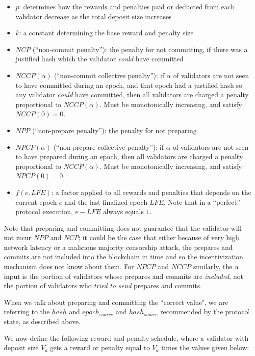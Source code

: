 \documentclass[12pt]{article}
\begin{document}
\begin{itemize}
\item $p$: determines how the rewards and penalties paid or deducted from each validator decrease as the total deposit size increases
\item $k$: a constant determining the base reward and penalty size
\item $NCP$ (``non-commit penalty''): the penalty for not committing, if there was a justified hash which the validator \textit{could} have committed
\item $NCCP(\alpha)$ (``non-commit collective penalty''): if $\alpha$ of validators are not seen to have committed during an epoch, and that epoch had a justified hash so any validator \textit{could} have committed, then all validators are charged a penalty proportional to $NCCP(\alpha)$. Must be monotonically increasing, and satisfy $NCCP(0) = 0$.
\item $NPP$ (``non-prepare penalty''): the penalty for not preparing
\item $NPCP(\alpha)$ (``non-prepare collective penalty''): if $\alpha$ of validators are not seen to have prepared during an epoch, then all validators are charged a penalty proportional to $NCCP(\alpha)$. Must be monotonically increasing, and satisfy $NPCP(0) = 0$.
\item $f(e, LFE)$: a factor applied to all rewards and penalties that depends on the current epoch $e$ and the last finalized epoch $LFE$. Note that in a ``perfect'' protocol execution, $e - LFE$ always equals $1$.
\end{itemize}

Note that preparing and committing does not guarantee that the validator will not incur $NPP$ and $NCP$; it could be the case that either because of very high network latency or a malicious majority censorship attack, the prepares and commits are not included into the blockchain in time and so the incentivization mechanism does not know about them. For $NPCP$ and $NCCP$ similarly, the $\alpha$ input is the portion of validators whose prepares and commits are \textit{included}, not the portion of validators who \textit{tried to send} prepares and commits. 

When we talk about preparing and committing the ``correct value", we are referring to the $hash$ and $epoch_{source}$ and $hash_{source}$ recommended by the protocol state, as described above.

We now define the following reward and penalty schedule, where a validator with deposit size $V_d$ gets a reward or penalty equal to $V_d$ times the values given below:
\end{document}
